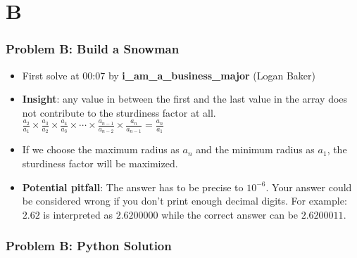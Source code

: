 \section{B}%
\label{sec:B}

\begin{frame}
  \frametitle{Problem B: Build a Snowman}
  \begin{itemize}
    \item First solve at 00:07 by \textbf{i\_am\_a\_business\_major} (Logan Baker)
    \item \textbf{Insight}: any value in between the first and the last value in the array does not contribute to the sturdiness factor at all.\\
    $\frac{a_2}{a_1} \times \frac{a_3}{a_2} \times \frac{a_4}{a_3} \times \cdots \times \frac{a_{n-1}}{a_{n-2}} \times \frac{a_n}{a_{n-1}} = \frac{a_n}{a_1}$
    \item If we choose the maximum radius as $a_n$ and the minimum radius as $a_1$, the sturdiness factor will be maximized.
    \item \textbf{Potential pitfall}: The answer has to be precise to $10^{-6}$. Your answer could be considered wrong if you don't print enough decimal digits. For example: $2.62$ is interpreted as $2.6200000$ while the correct answer can be $2.6200011$.
  \end{itemize}
\end{frame}


\begin{frame}
	\frametitle{Problem B: Python Solution}
\end{frame}
